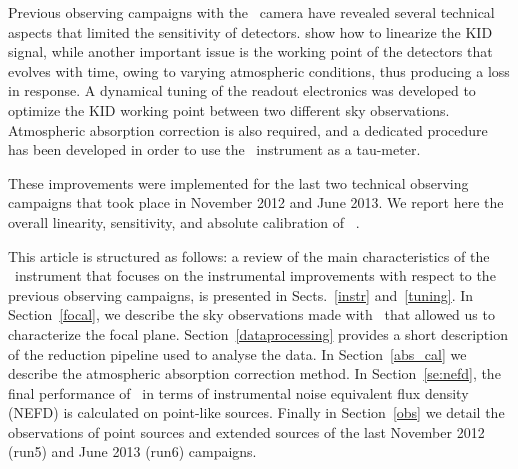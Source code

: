 Previous observing campaigns with the \NIKA\ camera have revealed several technical aspects that limited the sensitivity of detectors. \cite{Calvo2013} show how to linearize the KID signal, while another important issue is the working point of the detectors that evolves with time, owing to varying atmospheric conditions,
thus producing a loss in response. A dynamical tuning of the readout
electronics was developed to optimize the KID working point
between two different sky observations. Atmospheric absorption correction is also required, and a dedicated procedure has been developed in order to use the \NIKA\ instrument as a tau-meter.


These improvements were implemented for the last two technical observing
campaigns that took place in November 2012 and June 2013. We report here  the overall
linearity, sensitivity, and absolute calibration of \NIKA\ .


This article is structured as follows: a review of the main characteristics of
the \NIKA\ instrument that focuses on the instrumental improvements with respect
to the previous observing campaigns, is presented in Sects.~\ref{instr} and~\ref{tuning}.
In Section~\ref{focal}, we describe the sky observations made with \NIKA\ that
allowed us to characterize the focal plane. Section~\ref{dataprocessing} provides a short description of the reduction pipeline used to analyse the data. In Section~\ref{abs_cal} we describe the atmospheric absorption
correction method. In Section~\ref{se:nefd}, the final performance
of \NIKA\ in terms of  instrumental noise equivalent flux density (NEFD) is
calculated on point-like sources. Finally in Section~\ref{obs} we {detail the} observations
of point sources and extended sources of the last November 2012 (run5) and June
2013 (run6) campaigns.
